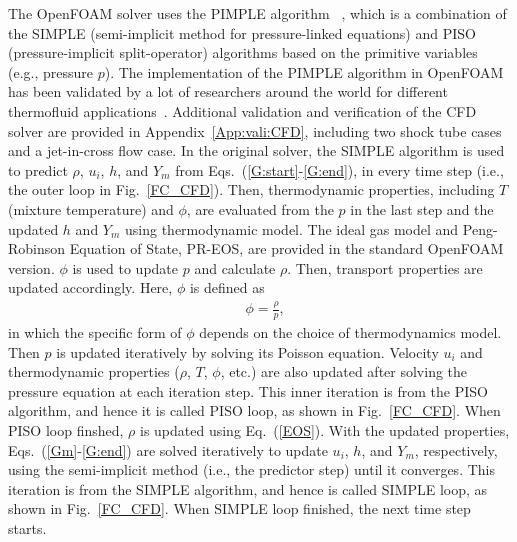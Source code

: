 The OpenFOAM solver uses the PIMPLE algorithm ~\cite{holzmann2016mathematics}, which is a combination of the SIMPLE (semi-implicit method for pressure-linked equations) \cite{patankar1983calculation} and PISO (pressure-implicit split-operator) algorithms \cite{issa1986solution} based on the primitive variables (e.g., pressure $p$). The implementation of the PIMPLE algorithm in OpenFOAM has been validated by a lot of researchers around the world for different thermofluid applications~\cite{robertson2015validation, higuera2014three,gaikwad2019openfoam,gamet2020validation,de2017implementation,ashton2019verification}. Additional validation and verification of the CFD solver are provided in Appendix~\ref{App:vali:CFD}, including two shock tube cases and a jet-in-cross flow case. In the original solver, the SIMPLE algorithm is used to predict $\rho$, $u_i$, $h$, and $Y_m$ from Eqs.~(\ref{G:start}-\ref{G:end}), in every time step (i.e., the outer loop in Fig.~\ref{FC_CFD}). Then, thermodynamic properties, including $T$ (mixture temperature) and $\phi$, are evaluated from the $p$ in the last step and the updated $h$ and $Y_m$ using thermodynamic model. The ideal gas model and Peng-Robinson Equation of State, PR-EOS, are provided in the standard OpenFOAM version. $\phi$ is used to update $p$ and calculate $\rho$. Then, transport properties are updated accordingly. %
Here, $\phi$ is defined as
\begin{align}
     & \phi = \frac{\rho} {p}, \label{EOS}
\end{align}
in which the specific form of $\phi$ depends on the choice of thermodynamics model. %
Then $p$ is updated iteratively by solving its Poisson equation. %
Velocity $u_i$ and thermodynamic properties ($\rho$, $T$, $\phi$, etc.) are also updated after solving the pressure equation at each iteration step.
This inner iteration is from the PISO algorithm, and hence it is called PISO loop, as shown in Fig.~\ref{FC_CFD}. %
When PISO loop finshed, $\rho$ is updated using Eq.~(\ref{EOS}). 
With the updated properties, Eqs.~(\ref{Gm}-\ref{G:end}) are solved iteratively to update $u_i$, $h$, and $Y_m$, respectively, using the semi-implicit method (i.e., the predictor step) until it converges. This iteration is from the SIMPLE algorithm, and hence is called SIMPLE loop, as shown in Fig.~\ref{FC_CFD}. When SIMPLE loop finished, the next time step starts.

